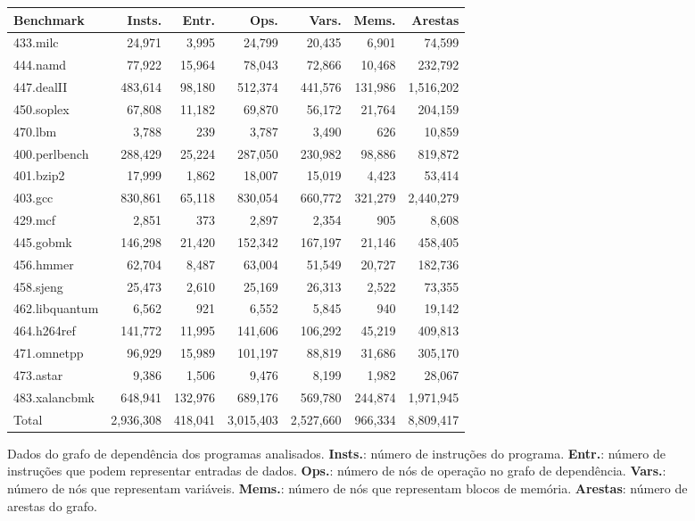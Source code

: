 \documentclass{llncs}
\begin{document}
\begin{figure}[t!]
\begin{center}
\renewcommand{\arraystretch}{1.2}
\begin{tabular*}{\textwidth}{@{\extracolsep{\fill}}lrrrrrr} \toprule
Benchmark 		&      Insts. 	& Entr.		&    Ops. 		&   Vars. 		&  Mems. 		& Arestas 		\\ \midrule
433.milc			&	24,971		&	3,995	&	24,799		&	20,435		&	6,901		&	74,599		\\ 
444.namd			&	77,922		&	15,964	&	78,043		&	72,866		&	10,468		&	232,792		\\ 
447.dealII		&	483,614		&	98,180	&	512,374		&	441,576		&	131,986		&	1,516,202	\\ 
450.soplex		&	67,808		&	11,182	&	69,870		&	56,172		&	21,764		&	204,159		\\ 
470.lbm			&	3,788		&	239		&	3,787		&	3,490		&	626			&	10,859		\\ 
400.perlbench	&	288,429		&	25,224	&	287,050		&	230,982		&	98,886		&	819,872		\\ 
401.bzip2		&	17,999		&	1,862	&	18,007		&	15,019		&	4,423		&	53,414		\\ 
403.gcc			&	830,861		&	65,118	&	830,054		&	660,772		&	321,279		&	2,440,279	\\ 
429.mcf			&	2,851		&	373		&	2,897		&	2,354		&	905			&	8,608		\\ 
445.gobmk		&	146,298		&	21,420	&	152,342		&	167,197		&	21,146		&	458,405		\\ 
456.hmmer		&	62,704		&	8,487	&	63,004		&	51,549		&	20,727		&	182,736		\\ 
458.sjeng		&	25,473		&	2,610	&	25,169		&	26,313		&	2,522		&	73,355		\\ 
462.libquantum	&	6,562		&	921		&	6,552		&	5,845		&	940			&	19,142		\\ 
464.h264ref		&	141,772		&	11,995	&	141,606		&	106,292		&	45,219		&	409,813		\\ 
471.omnetpp		&	96,929		&	15,989	&	101,197		&	88,819		&	31,686		&	305,170		\\ 
473.astar		&	9,386		&	1,506	&	9,476		&	8,199		&	1,982		&	28,067		\\ 
483.xalancbmk	&	648,941		&	132,976	&	689,176		&	569,780		&	244,874		&	1,971,945	\\ \midrule
Total			&	2,936,308	&	418,041	&	3,015,403	&	2,527,660	&	966,334		&	8,809,417	\\ \bottomrule
\end{tabular*}
\end{center}
\caption{\label{fig:tblDepGraph}Dados do grafo de dependência dos programas analisados.
{\bf Insts.}: número de instruções do programa.
{\bf Entr.}: número de instruções que podem representar entradas de dados.
{\bf Ops.}: número de nós de operação no grafo de dependência.
{\bf Vars.}: número de nós que representam variáveis.
{\bf Mems.}: número de nós que representam blocos de memória.
{\bf Arestas}: número de arestas do grafo.}
\end{figure}
\end{document}
